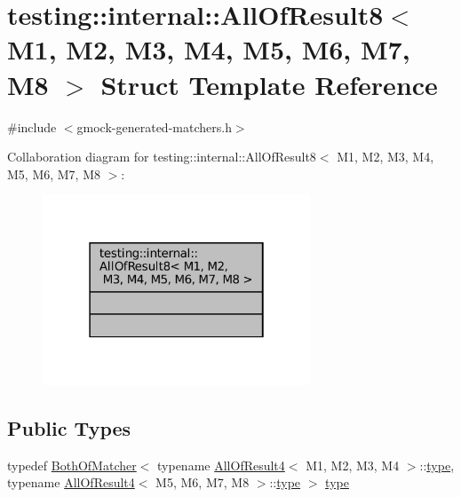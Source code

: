 \hypertarget{structtesting_1_1internal_1_1AllOfResult8}{}\section{testing\+:\+:internal\+:\+:All\+Of\+Result8$<$ M1, M2, M3, M4, M5, M6, M7, M8 $>$ Struct Template Reference}
\label{structtesting_1_1internal_1_1AllOfResult8}


{\ttfamily \#include $<$gmock-\/generated-\/matchers.\+h$>$}



Collaboration diagram for testing\+:\+:internal\+:\+:All\+Of\+Result8$<$ M1, M2, M3, M4, M5, M6, M7, M8 $>$\+:
\nopagebreak
\begin{figure}[H]
\begin{center}
\leavevmode
\includegraphics[width=226pt]{structtesting_1_1internal_1_1AllOfResult8__coll__graph}
\end{center}
\end{figure}
\subsection*{Public Types}
\begin{DoxyCompactItemize}
\item 
typedef \hyperlink{classtesting_1_1internal_1_1BothOfMatcher}{Both\+Of\+Matcher}$<$ typename \hyperlink{structtesting_1_1internal_1_1AllOfResult4}{All\+Of\+Result4}$<$ M1, M2, M3, M4 $>$\+::\hyperlink{structtesting_1_1internal_1_1AllOfResult8_a7103892a28c35221b9e62e871c577727}{type}, typename \hyperlink{structtesting_1_1internal_1_1AllOfResult4}{All\+Of\+Result4}$<$ M5, M6, M7, M8 $>$\+::\hyperlink{structtesting_1_1internal_1_1AllOfResult8_a7103892a28c35221b9e62e871c577727}{type} $>$ \hyperlink{structtesting_1_1internal_1_1AllOfResult8_a7103892a28c35221b9e62e871c577727}{type}
\end{DoxyCompactItemize}


